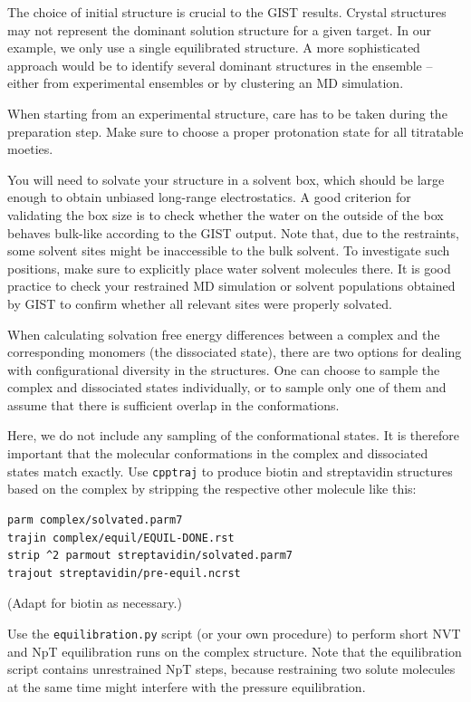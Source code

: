 \documentclass[9pt,tutorial]{livecoms}
\newcommand{\software}{\texttt}
\begin{document}
The choice of initial structure is crucial to the GIST results.
Crystal structures may not represent the dominant solution structure for a given target.
In our example, we only use a single equilibrated structure.
A more sophisticated approach would be to identify several dominant structures in the ensemble -- either from experimental ensembles or by clustering an MD simulation.

When starting from an experimental structure, care has to be taken during the preparation step.
Make sure to choose a proper protonation state for all titratable moeties.

You will need to solvate your structure in a solvent box, which should be large enough to obtain unbiased long-range electrostatics.
A good criterion for validating the box size is to check whether the water on the outside of the box behaves bulk-like according to the GIST output.
Note that, due to the restraints, some solvent sites might be inaccessible to the bulk solvent.
To investigate such positions, make sure to explicitly place water solvent molecules there.
It is good practice to check your restrained MD simulation or solvent populations obtained by GIST to confirm whether all relevant sites were properly solvated.

When calculating solvation free energy differences between a complex and the corresponding monomers (the dissociated state), there are two options for dealing with configurational diversity in the structures.
One can choose to sample the complex and dissociated states individually, or to sample only one of them and assume that there is sufficient overlap in the conformations.

Here, we do not include any sampling of the conformational states.
It is therefore important that the molecular conformations in the complex and dissociated states match exactly.
Use \software{cpptraj} to produce biotin and streptavidin structures based on the complex by stripping the respective other molecule like this:
\begin{lstlisting}[style=cpptraj]
parm complex/solvated.parm7
trajin complex/equil/EQUIL-DONE.rst
strip ^2 parmout streptavidin/solvated.parm7
trajout streptavidin/pre-equil.ncrst
\end{lstlisting}
(Adapt for biotin as necessary.)

Use the \software{equilibration.py} script (or your own procedure) to perform short NVT and NpT equilibration runs on the complex structure.
Note that the equilibration script contains unrestrained NpT steps, because restraining two solute molecules at the same time might interfere with the pressure equilibration.
\end{document}

